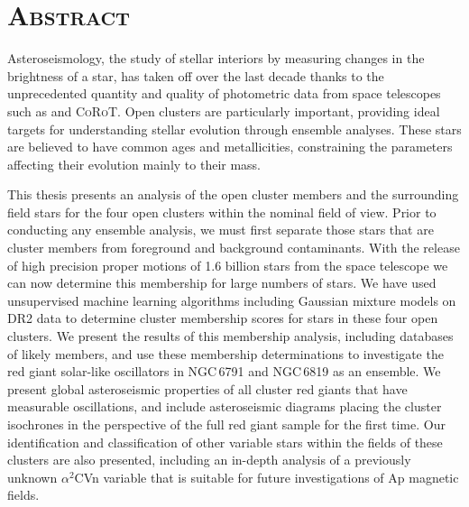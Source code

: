 \chapter*{\textsc{Abstract}}

\vspace{1.5cm}

Asteroseismology, the study of stellar interiors by measuring changes in the brightness of a star, has taken off over the last decade thanks to the unprecedented quantity and quality of photometric data from space telescopes such as \Kepler{} and \textsc{CoRoT}. Open clusters are particularly important, providing ideal targets for understanding stellar evolution through ensemble analyses. These stars are believed to have common ages and metallicities, constraining the parameters affecting their evolution mainly to their mass. 

This thesis presents an analysis of the open cluster members and the surrounding field stars for the four open clusters within the nominal \Kepler{} field of view. %
Prior to conducting any ensemble analysis, we must first separate those stars that are cluster members from foreground and background contaminants. With the release of high precision proper motions of 1.6 billion stars from the \Gaia{} space telescope we can now determine this membership for large numbers of stars. We have used unsupervised machine learning algorithms including Gaussian mixture models on \Gaia{} DR2 data to determine cluster membership scores for stars in these four open clusters. We present the results of this membership analysis, including databases of likely members, and use these membership determinations to investigate the red giant solar-like oscillators in NGC\,6791 and NGC\,6819 as an ensemble. We present global asteroseismic properties of all cluster red giants that have measurable oscillations, and include asteroseismic diagrams placing the cluster isochrones in the perspective of the full \Kepler{} red giant sample for the first time. Our identification and classification of other variable stars within the fields of these clusters are also presented, including an in-depth analysis of a previously unknown $\alpha^2$CVn variable that is suitable for future investigations of Ap magnetic fields.